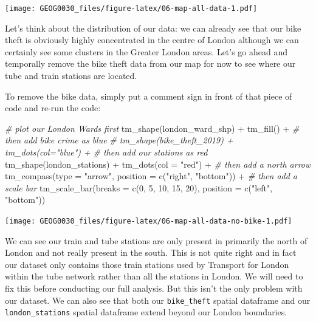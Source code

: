 \documentclass[
]{book}
\newenvironment{Shaded}{\begin{snugshade}}{\end{snugshade}}
\newcommand{\AttributeTok}[1]{\textcolor[rgb]{0.77,0.63,0.00}{#1}}
\newcommand{\CommentTok}[1]{\textcolor[rgb]{0.56,0.35,0.01}{\textit{#1}}}
\newcommand{\DecValTok}[1]{\textcolor[rgb]{0.00,0.00,0.81}{#1}}
\newcommand{\FunctionTok}[1]{\textcolor[rgb]{0.00,0.00,0.00}{#1}}
\newcommand{\NormalTok}[1]{#1}
\newcommand{\SpecialCharTok}[1]{\textcolor[rgb]{0.00,0.00,0.00}{#1}}
\newcommand{\StringTok}[1]{\textcolor[rgb]{0.31,0.60,0.02}{#1}}
\begin{document}
\texttt{[image: GEOG0030\_files/figure-latex/06-map-all-data-1.pdf]}

Let's think about the distribution of our data: we can already see that our bike theft is obviously highly concentrated in the centre of London although we can certainly see some clusters in the Greater London areas. Let's go ahead and temporally remove the bike theft data from our map for now to see where our tube and train stations are located.

To remove the bike data, simply put a comment sign in front of that piece of code and re-run the code:

\begin{Shaded}
\begin{Highlighting}[]
\CommentTok{\# plot our London Wards first}
\FunctionTok{tm\_shape}\NormalTok{(london\_ward\_shp) }\SpecialCharTok{+} \FunctionTok{tm\_fill}\NormalTok{() }\SpecialCharTok{+}
  \CommentTok{\# then add bike crime as blue}
  \CommentTok{\# tm\_shape(bike\_theft\_2019) + tm\_dots(col="blue") +}
  \CommentTok{\# then add our stations as red}
  \FunctionTok{tm\_shape}\NormalTok{(london\_stations) }\SpecialCharTok{+} \FunctionTok{tm\_dots}\NormalTok{(}\AttributeTok{col =} \StringTok{"red"}\NormalTok{) }\SpecialCharTok{+}
  \CommentTok{\# then add a north arrow}
  \FunctionTok{tm\_compass}\NormalTok{(}\AttributeTok{type =} \StringTok{"arrow"}\NormalTok{, }\AttributeTok{position =} \FunctionTok{c}\NormalTok{(}\StringTok{"right"}\NormalTok{, }\StringTok{"bottom"}\NormalTok{)) }\SpecialCharTok{+}
  \CommentTok{\# then add a scale bar}
  \FunctionTok{tm\_scale\_bar}\NormalTok{(}\AttributeTok{breaks =} \FunctionTok{c}\NormalTok{(}\DecValTok{0}\NormalTok{, }\DecValTok{5}\NormalTok{, }\DecValTok{10}\NormalTok{, }\DecValTok{15}\NormalTok{, }\DecValTok{20}\NormalTok{), }\AttributeTok{position =} \FunctionTok{c}\NormalTok{(}\StringTok{"left"}\NormalTok{, }\StringTok{"bottom"}\NormalTok{))}
\end{Highlighting}
\end{Shaded}

\texttt{[image: GEOG0030\_files/figure-latex/06-map-all-data-no-bike-1.pdf]}

We can see our train and tube stations are only present in primarily the north of London and not really present in the south. This is not quite right and in fact our dataset only contains those train stations used by Transport for London within the tube network rather than all the stations in London. We will need to fix this before conducting our full analysis. But this isn't the only problem with our dataset. We can also see that both our \texttt{bike\_theft} spatial dataframe and our \texttt{london\_stations} spatial dataframe extend beyond our London boundaries.
\end{document}

